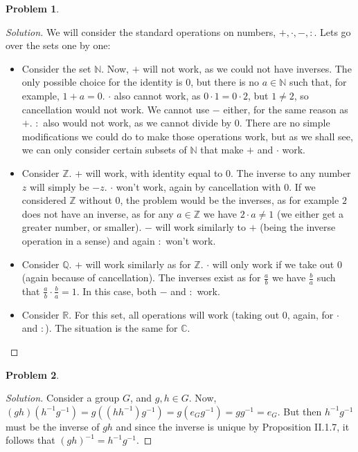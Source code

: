 \documentclass{article}
\theoremstyle{definition}
\newtheorem{problem-internal}{Problem}[subsection]
\newenvironment{problem}{
	\medskip
	\begin{problem-internal}
	}{
\end{problem-internal}
}
\newenvironment{solution}{
	\begin{proof}[Solution]
		\vspace{-8px}
		\setlength{\parskip}{4px}
		\setlength{\parindent}{0px}
	}{
\end{proof}
}
\begin{document}
\begin{problem}
\end{problem}

\begin{solution}
	We will consider the standard operations on numbers, $+,\cdot,-, :$. Lets go over the sets one by one:
	\begin{itemize}
		\item Consider the set $\mathbb{N}$. Now, $+$ will not work, as we could not have inverses. The only possible choice for the identity is $0$, but there is no $a \in \mathbb{N}$ such that, for example, $1+a=0$. $\cdot$ also cannot work, as $0 \cdot 1 = 0 \cdot 2$, but $1 \neq 2$, so cancellation would not work. We cannot use $-$ either, for the same reason as $+$. $:$ also would not work, as we cannot divide by $0$. There are no simple modifications we could do to make those operations work, but as we shall see, we can only consider certain subsets of $\mathbb{N}$ that make $+$ and $\cdot$ work.
		\item Consider $\mathbb{Z}$. $+$ will work, with identity equal to 0. The inverse to any number $z$ will simply be $-z$. $\cdot$ won't work, again by cancellation with $0$. If we considered $\mathbb{Z}$ without $0$, the problem would be the inverses, as for example $2$ does not have an inverse, as for any $a \in \mathbb{Z}$ we have $2 \cdot a \neq 1$ (we either get a greater number, or smaller). $-$ will work similarly to $+$ (being the inverse operation in a sense) and again $:$ won't work.
		\item Consider $\mathbb{Q}$. $+$ will work similarly as for $\mathbb{Z}$. $\cdot$ will only work if we take out $0$ (again because of cancellation). The inverses exist as for $\frac{a}{b}$ we have $\frac{b}{a}$ such that $\frac{a}{b}\cdot\frac{b}{a}=1$. In this case, both $-$ and $:$ work.
		\item Consider $\mathbb{R}$. For this set, all operations will work (taking out $0$, again, for $\cdot$ and $:$). The situation is the same for $\mathbb{C}$.
	\end{itemize}
\end{solution}

\begin{problem}
\end{problem}

\begin{solution}
	Consider a group $G$, and $g, h \in G$. Now, $(gh)(h^{-1}g^{-1})=g((hh^{-1})g^{-1})=g(e_Gg^{-1})=gg^{-1}=e_G$. But then $h^{-1}g^{-1}$ must be the inverse of $gh$ and since the inverse is unique by Proposition II.1.7, it follows that $(gh)^{-1} = h^{-1}g^{-1}$.
\end{solution}
\end{document}
